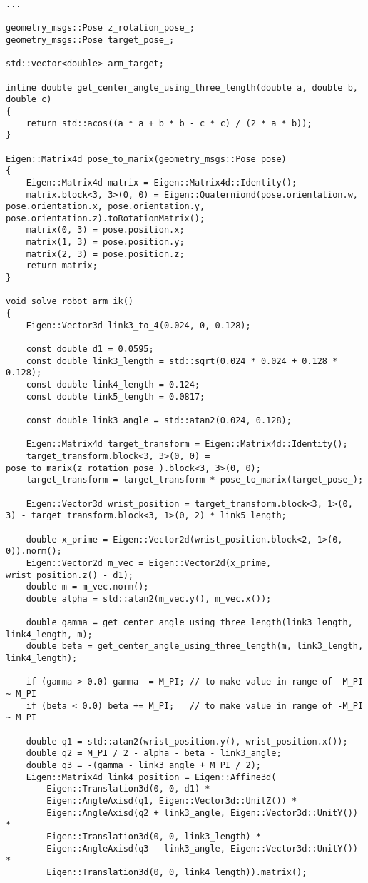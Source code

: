 \documentclass{article}
\begin{document}
\begin{verbatim}
...

geometry_msgs::Pose z_rotation_pose_;
geometry_msgs::Pose target_pose_;
  
std::vector<double> arm_target;

inline double get_center_angle_using_three_length(double a, double b, double c)
{
	return std::acos((a * a + b * b - c * c) / (2 * a * b));
}
  
Eigen::Matrix4d pose_to_marix(geometry_msgs::Pose pose)
{
	Eigen::Matrix4d matrix = Eigen::Matrix4d::Identity();
	matrix.block<3, 3>(0, 0) = Eigen::Quaterniond(pose.orientation.w, pose.orientation.x, pose.orientation.y, pose.orientation.z).toRotationMatrix();
	matrix(0, 3) = pose.position.x;
	matrix(1, 3) = pose.position.y;
	matrix(2, 3) = pose.position.z;
	return matrix;
}
  
void solve_robot_arm_ik()
{
	Eigen::Vector3d link3_to_4(0.024, 0, 0.128);
	  
	const double d1 = 0.0595;
	const double link3_length = std::sqrt(0.024 * 0.024 + 0.128 * 0.128);
	const double link4_length = 0.124;
	const double link5_length = 0.0817;
	  
	const double link3_angle = std::atan2(0.024, 0.128);
	  
	Eigen::Matrix4d target_transform = Eigen::Matrix4d::Identity();
	target_transform.block<3, 3>(0, 0) = pose_to_marix(z_rotation_pose_).block<3, 3>(0, 0);
	target_transform = target_transform * pose_to_marix(target_pose_);

	Eigen::Vector3d wrist_position = target_transform.block<3, 1>(0, 3) - target_transform.block<3, 1>(0, 2) * link5_length;
	  
	double x_prime = Eigen::Vector2d(wrist_position.block<2, 1>(0, 0)).norm();
	Eigen::Vector2d m_vec = Eigen::Vector2d(x_prime, wrist_position.z() - d1);
	double m = m_vec.norm();
	double alpha = std::atan2(m_vec.y(), m_vec.x());
	  
	double gamma = get_center_angle_using_three_length(link3_length, link4_length, m);
	double beta = get_center_angle_using_three_length(m, link3_length, link4_length);
	 
	if (gamma > 0.0) gamma -= M_PI; // to make value in range of -M_PI ~ M_PI
	if (beta < 0.0) beta += M_PI;   // to make value in range of -M_PI ~ M_PI
	  
	double q1 = std::atan2(wrist_position.y(), wrist_position.x());
	double q2 = M_PI / 2 - alpha - beta - link3_angle;
	double q3 = -(gamma - link3_angle + M_PI / 2);
	Eigen::Matrix4d link4_position = Eigen::Affine3d(
		Eigen::Translation3d(0, 0, d1) *
		Eigen::AngleAxisd(q1, Eigen::Vector3d::UnitZ()) *
		Eigen::AngleAxisd(q2 + link3_angle, Eigen::Vector3d::UnitY()) *
		Eigen::Translation3d(0, 0, link3_length) *
		Eigen::AngleAxisd(q3 - link3_angle, Eigen::Vector3d::UnitY()) *
		Eigen::Translation3d(0, 0, link4_length)).matrix();
	  

\end{verbatim}
\end{document}
